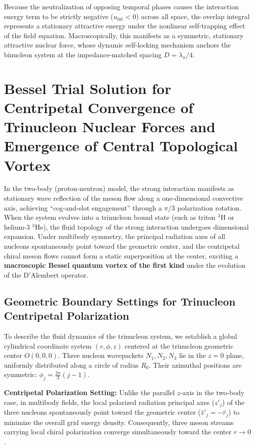\documentclass[12pt, a4paper]{article}
\begin{document}
Because the neutralization of opposing temporal phases causes the interaction energy term to be strictly negative ($u_{\mathrm{int}} < 0$) across all space, the overlap integral represents a stationary attractive energy under the nonlinear self-trapping effect of the field equation. Macroscopically, this manifests as a symmetric, stationary attractive nuclear force, whose dynamic self-locking mechanism anchors the binucleon system at the impedance-matched spacing $D = \lambda_\pi / 4$.

\section{Bessel Trial Solution for Centripetal Convergence of Trinucleon Nuclear Forces and Emergence of Central Topological Vortex}

In the two-body (proton-neutron) model, the strong interaction manifests as stationary wave reflection of the meson flow along a one-dimensional convective axis, achieving ``cog-and-slot engagement'' through a $\pi/3$ polarization rotation. When the system evolves into a trinucleon bound state (such as triton ${}^3\text{H}$ or helium-3 ${}^3\text{He}$), the fluid topology of the strong interaction undergoes dimensional expansion. Under multibody symmetry, the principal radiation axes of all nucleons spontaneously point toward the geometric center, and the centripetal chiral meson flows cannot form a static superposition at the center, exciting a \textbf{macroscopic Bessel quantum vortex of the first kind} under the evolution of the D'Alembert operator.

\subsection{Geometric Boundary Settings for Trinucleon Centripetal Polarization}

To describe the fluid dynamics of the trinucleon system, we establish a global cylindrical coordinate system $(r, \phi, z)$ centered at the trinucleon geometric center $O(0,0,0)$. Three nucleon wavepackets $N_1, N_2, N_3$ lie in the $z=0$ plane, uniformly distributed along a circle of radius $R_0$. Their azimuthal positions are symmetric: $\phi_j = \frac{2\pi}{3}(j-1)$.

\textbf{Centripetal Polarization Setting:} Unlike the parallel $z$-axis in the two-body case, in multibody fields, the local polarized radiation principal axes ($z'_j$) of the three nucleons spontaneously point toward the geometric center ($\hat{z}'_j = -\hat{r}_j$) to minimize the overall grid energy density. Consequently, three meson streams carrying local chiral polarization converge simultaneously toward the center $r \to 0$.
\end{document}
